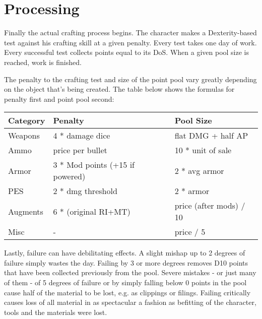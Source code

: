 \documentclass[12pt,a4paper,openany,usenames,dvipsnames]{book}
\begin{document}
	\chapter{Processing}
	Finally the actual crafting process begins.
	The character makes a Dexterity-based test against his crafting skill at a given penalty.
	Every test takes one day of work.
	Every successful test collects points equal to its DoS.
	When a given pool size is reached, work is finished.\par
	The penalty to the crafting test and size of the point pool vary greatly depending on the object that’s being created. The table below shows the formulas for penalty first and point pool second:
	\par
	\begin{tabularx}{\columnwidth}{X|ll}
		Category & Penalty & Pool Size \\ \hline
		Weapons & 4 * damage dice & flat DMG + half AP \\
		Ammo & price per bullet & 10 * unit of sale \\
		Armor & 3 * Mod points (+15 if powered) & 2 * avg armor \\
		PES & 2 * dmg threshold & 2 * armor \\
		Augments & 6 * (original RI+MT) & price (after mods) / 10 \\
		Misc & - & price / 5
	\end{tabularx}\par
	Lastly, failure can have debilitating effects.
	A slight mishap up to 2 degrees of failure simply wastes the day.
	Failing by 3 or more degrees removes D10 points that have been collected previously from the pool.
	Severe mistakes - or just many of them - of 5 degrees of failure or by simply falling below 0 points in the pool cause half of the material to be lost, e.g. as clippings or filings.
	Failing critically causes loss of all material in as spectacular a fashion as befitting of the character, tools and the materials were lost.
\end{document}
